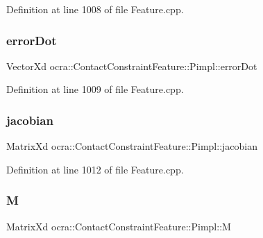 Definition at line 1008 of file Feature.\+cpp.

\hypertarget{structocra_1_1ContactConstraintFeature_1_1Pimpl_a43821a1f06ddd5af36588e84def45897}{}\label{structocra_1_1ContactConstraintFeature_1_1Pimpl_a43821a1f06ddd5af36588e84def45897} 
\subsubsection{\texorpdfstring{error\+Dot}{errorDot}}
{\footnotesize\ttfamily Vector\+Xd ocra\+::\+Contact\+Constraint\+Feature\+::\+Pimpl\+::error\+Dot}



Definition at line 1009 of file Feature.\+cpp.

\hypertarget{structocra_1_1ContactConstraintFeature_1_1Pimpl_ab7a5dfed0b05f6871bad4fcf61d7e998}{}\label{structocra_1_1ContactConstraintFeature_1_1Pimpl_ab7a5dfed0b05f6871bad4fcf61d7e998} 
\subsubsection{\texorpdfstring{jacobian}{jacobian}}
{\footnotesize\ttfamily Matrix\+Xd ocra\+::\+Contact\+Constraint\+Feature\+::\+Pimpl\+::jacobian}



Definition at line 1012 of file Feature.\+cpp.

\hypertarget{structocra_1_1ContactConstraintFeature_1_1Pimpl_a2de0104acc90d7ef05e0b5d5c6142ed5}{}\label{structocra_1_1ContactConstraintFeature_1_1Pimpl_a2de0104acc90d7ef05e0b5d5c6142ed5} 
\subsubsection{\texorpdfstring{M}{M}}
{\footnotesize\ttfamily Matrix\+Xd ocra\+::\+Contact\+Constraint\+Feature\+::\+Pimpl\+::M}



